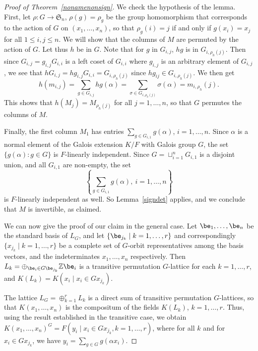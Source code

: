 \documentclass[12pt]{article}
\theoremstyle{plain}
\newcommand{\Z}{\ensuremath{\mathbb{Z}}}
\begin{document}
\begin{proof}[Proof of Theorem~\ref{nonamenonsign}]
  We check the hypothesis of the lemma. First, let $\rho: G \to
  \mathfrak{S}_n$, $\rho(g) = \rho_g$ be the group homomorphism that
  corresponds to the action of $G$ on $(x_1, \ldots , x_n)$, so that
  $\rho_g(i) = j$ if and only if $g(x_i) = x_j$ for all $1 \leq
  i,j\leq n$. We will show that the columns of $M$ are permuted by the
  action of $G$. Let thus $h$ be in $G$. Note that for $g$ in
  $G_{i,j}$, $hg$ is in $G_{i,\rho_h(j)}$.
  Then since $G_{i,j}=g_{i,j}G_{i,i}$ is a left coset of $G_{i,i}$ where $g_{i,j}$
is an arbitrary element of $G_{i,j}$, we see that $hG_{i,j}=hg_{i,j}G_{i,i}=G_{i,\rho_h(j)}$ 
since $hg_{ij}\in G_{i,\rho_h(j)}$.  We then get
  $$h(m_{i,j}) = \sum_{g \in G_{i,j}}hg(\alpha) = \sum_{\sigma \in
    G_{i, \rho_{h}(j)}}\sigma (\alpha) = m_{i,\rho_{h}}(j).$$ This
  shows that $h(M_j) = M_{\rho_h(j)}$ for all $j = 1, \ldots, n$, so
  that $G$ permutes the columns of $M$. 
  
  Finally, the first column $M_1$ has entries $\sum_{g \in
      G_{i,1}}g(\alpha)$, $i = 1, \ldots,n$.  Since $\alpha$ is a
  normal element of the Galois extension $K/F$ with Galois group $G$,
  the set $\lbrace g(\alpha): g \in G \rbrace$ is $F$-linearly
  independent. Since $G = \sqcup^n_{i =1}G_{i,1}$ is a disjoint union,
  and all $G_{i,1}$ are non-empty,
  the set
  $$\left\lbrace \sum_{g \in G_{i,1}}g(\alpha),\ i = 1, \ldots, n
  \right\rbrace$$ is $F$-linearly independent as well.  So
  Lemma~\ref{signdet} applies, and we conclude that $M$ is invertible,
  as claimed.

  \medskip 
  
  We can now give the proof of our claim in the general case.  Let
  $\be_1, \ldots , \be_n$ be the standard basis of $L_G$, and let
  $\{\be_{j_k} \mid k = 1, \ldots, r\}$ and correspondingly $\{x_{j_k}
  \mid k = 1, \ldots, r\}$ be a complete set of $G$-orbit
  representatives among the basis vectors, and the indeterminates
  $x_1, \ldots, x_n$ respectively. Then $L_k = \oplus_{ \be_i \in G
    \be_{j_{k}} } \Z \be_i$ is a transitive permutation $G$-lattice
  for each $k = 1, \ldots, r$, and $K(L_k) = K(x_i \mid x_i \in
  Gx_{j_k})$.
  
  The lattice $L_G = \oplus^r_{k =1} L_k$ is a direct sum of transitive
  permutation $G$-lattices, 
  so that $K(x_1,\dots,x_n)$
  is the
  compositum of the fields $K(L_k)$, $k=1,\dots,r$. Thus, using the 
  result established in the transitive case, we obtain
  $K(x_1,\dots,x_n)^G=F(y_i \mid x_i \in Gx_{j_k}, k=1,\dots,r)$, where
  for all $k$ and for $x_i \in Gx_{j_k}$, we have $y_i=\sum_{g \in G}
  g(\alpha x_i)$.
\end{proof}
\end{document}
